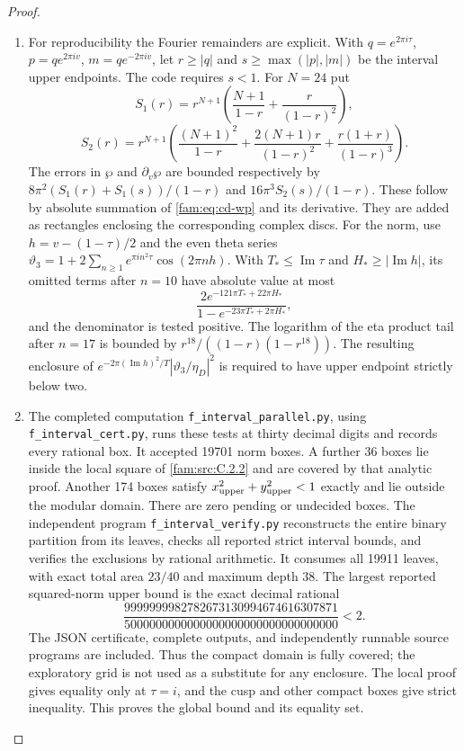 \begin{proof}
\begin{enumerate}[label=\arabic*.,leftmargin=*]
\item For reproducibility the Fourier remainders are explicit. With
$q=e^{2\pi i\tau}$, $p=q e^{2\pi iv}$, $m=q e^{-2\pi iv}$, let
$r\geq|q|$ and $s\geq\max(|p|,|m|)$ be the interval upper endpoints.
The code requires $s<1$. For $N=24$ put
\[
 S_1(r)=r^{N+1}\left(\frac{N+1}{1-r}+\frac r{(1-r)^2}\right),
\]
\[
 S_2(r)=r^{N+1}\left(\frac{(N+1)^2}{1-r}+
 \frac{2(N+1)r}{(1-r)^2}+\frac{r(1+r)}{(1-r)^3}\right).
\]
The errors in $\wp$ and $\partial_v\wp$ are bounded respectively by
$8\pi^2(S_1(r)+S_1(s))/(1-r)$ and $16\pi^3S_2(s)/(1-r)$.
These follow by absolute summation of \eqref{fam:eq:cd-wp} and its derivative.
They are added as rectangles enclosing the corresponding complex discs.
For the norm, use $h=v-(1-\tau)/2$ and the even theta series
$\vartheta_3=1+2\sum_{n\geq1}e^{\pi i n^2\tau}\cos(2\pi nh)$.
With $T_*\leq\operatorname{Im}\tau$ and $H_*\geq|\operatorname{Im}h|$,
its omitted terms after $n=10$ have absolute value at most
\[
 \frac{2e^{-121\pi T_*+22\pi H_*}}
 {1-e^{-23\pi T_*+2\pi H_*}},
\]
and the denominator is tested positive. The logarithm of the eta
product tail after $n=17$ is bounded by
$r^{18}/((1-r)(1-r^{18}))$. The resulting enclosure of
$e^{-2\pi(\operatorname{Im}h)^2/T}|\vartheta_3/\eta_D|^2$
is required to have upper endpoint strictly below two.

\item The completed computation \texttt{f\_interval\_parallel.py}, using
\texttt{f\_interval\_cert.py}, runs these tests at thirty decimal digits
and records every rational box. It accepted 19701 norm boxes. A further
36 boxes lie inside the local square of \ref{fam:src:C.2.2} and are covered by that
analytic proof. Another 174 boxes satisfy
$x_{\rm upper}^2+y_{\rm upper}^2<1$ exactly and lie outside the modular
domain. There are zero pending or undecided boxes. The independent
program \texttt{f\_interval\_verify.py} reconstructs the entire binary
partition from its leaves, checks all reported strict interval bounds,
and verifies the exclusions by rational arithmetic. It consumes all
19911 leaves, with exact total area $23/40$ and maximum depth 38.
The largest reported squared-norm upper bound is the exact decimal
rational
\[
 \frac{9999999982782673130994674616307871}
 {5000000000000000000000000000000000}<2.
\]
The JSON certificate, complete outputs, and independently runnable
source programs are included. Thus the compact domain is fully covered;
the exploratory grid is not used as a substitute for any enclosure.
The local proof gives equality only at $\tau=i$, and the cusp and other
compact boxes give strict inequality. This proves the global bound and
its equality set.


\end{enumerate}
\end{proof}
